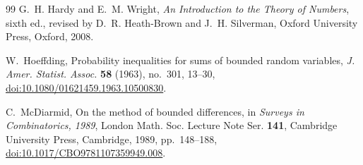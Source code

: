 \documentclass[11pt]{article}
\numberwithin{equation}{section}
\theoremstyle{definition}
\theoremstyle{remark}
\begin{document}
\begin{thebibliography}{99}
G.~H. Hardy and E.~M. Wright,
\newblock \emph{An Introduction to the Theory of Numbers},
\newblock sixth ed., revised by D.~R. Heath-Brown and J.~H. Silverman,
Oxford University Press, Oxford, 2008.

W.~Hoeffding,
\newblock Probability inequalities for sums of bounded random variables,
\newblock \emph{J. Amer. Statist. Assoc.} \textbf{58} (1963), no.~301,
13--30,
\newblock \href{https://doi.org/10.1080/01621459.1963.10500830}
{doi:10.1080/01621459.1963.10500830}.

C.~McDiarmid,
\newblock On the method of bounded differences,
\newblock in \emph{Surveys in Combinatorics, 1989},
London Math. Soc. Lecture Note Ser. \textbf{141},
Cambridge University Press, Cambridge, 1989, pp.~148--188,
\newblock \href{https://doi.org/10.1017/CBO9781107359949.008}
{doi:10.1017/CBO9781107359949.008}.

\end{thebibliography}
\end{document}
